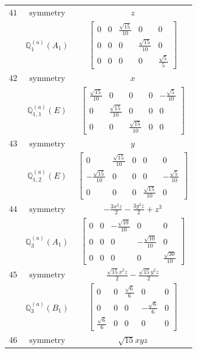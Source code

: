 \documentclass[fleqn,8pt,landscape]{jsarticle}
\begin{document}
\begin{longtable}{ccc}
$ 41 $ & $ \text{symmetry} $ & $ z $ \\
$  $ & $ \mathbb{Q}_{1}^{(a)}(A_{1}) $ & $ \begin{bmatrix} 0 & 0 & \frac{\sqrt{15}}{10} & 0 & 0 \\ 0 & 0 & 0 & \frac{\sqrt{15}}{10} & 0 \\ 0 & 0 & 0 & 0 & \frac{\sqrt{5}}{5} \end{bmatrix} $ \\ \hline
$ 42 $ & $ \text{symmetry} $ & $ x $ \\
$  $ & $ \mathbb{Q}_{1,1}^{(a)}(E) $ & $ \begin{bmatrix} \frac{\sqrt{15}}{10} & 0 & 0 & 0 & - \frac{\sqrt{5}}{10} \\ 0 & \frac{\sqrt{15}}{10} & 0 & 0 & 0 \\ 0 & 0 & \frac{\sqrt{15}}{10} & 0 & 0 \end{bmatrix} $ \\ \hline
$ 43 $ & $ \text{symmetry} $ & $ y $ \\
$  $ & $ \mathbb{Q}_{1,2}^{(a)}(E) $ & $ \begin{bmatrix} 0 & \frac{\sqrt{15}}{10} & 0 & 0 & 0 \\ - \frac{\sqrt{15}}{10} & 0 & 0 & 0 & - \frac{\sqrt{5}}{10} \\ 0 & 0 & 0 & \frac{\sqrt{15}}{10} & 0 \end{bmatrix} $ \\ \hline
$ 44 $ & $ \text{symmetry} $ & $ - \frac{3 x^{2} z}{2} - \frac{3 y^{2} z}{2} + z^{3} $ \\
$  $ & $ \mathbb{Q}_{3}^{(a)}(A_{1}) $ & $ \begin{bmatrix} 0 & 0 & - \frac{\sqrt{10}}{10} & 0 & 0 \\ 0 & 0 & 0 & - \frac{\sqrt{10}}{10} & 0 \\ 0 & 0 & 0 & 0 & \frac{\sqrt{30}}{10} \end{bmatrix} $ \\ \hline
$ 45 $ & $ \text{symmetry} $ & $ \frac{\sqrt{15} x^{2} z}{2} - \frac{\sqrt{15} y^{2} z}{2} $ \\
$  $ & $ \mathbb{Q}_{3}^{(a)}(B_{1}) $ & $ \begin{bmatrix} 0 & 0 & \frac{\sqrt{6}}{6} & 0 & 0 \\ 0 & 0 & 0 & - \frac{\sqrt{6}}{6} & 0 \\ \frac{\sqrt{6}}{6} & 0 & 0 & 0 & 0 \end{bmatrix} $ \\ \hline
$ 46 $ & $ \text{symmetry} $ & $ \sqrt{15} x y z $ \\

\end{longtable}
\end{document}
